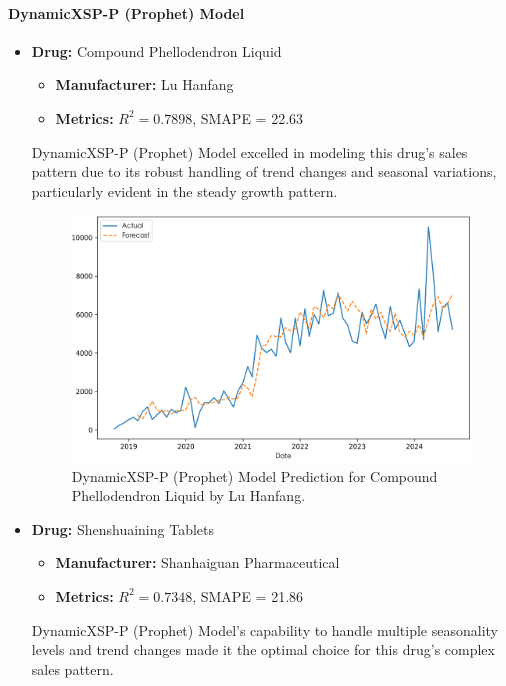 \documentclass[journal]{IEEEtran}
\begin{document}
\paragraph{DynamicXSP-P (Prophet) Model}
\begin{itemize}
\item \textbf{Drug:} Compound Phellodendron Liquid
\begin{itemize}
\item \textbf{Manufacturer:} Lu Hanfang
\item \textbf{Metrics:} $R^2 = 0.7898$, SMAPE = 22.63
\end{itemize}
DynamicXSP-P (Prophet) Model excelled in modeling this drug's sales pattern due to its robust handling of trend changes and seasonal variations, particularly evident in the steady growth pattern.
\begin{figure}[H]
\centering
\includegraphics[width=\linewidth]{../Result_Paper/Prophet_Prediction_复方黄柏液涂剂_鲁汉方.png}
\caption{DynamicXSP-P (Prophet) Model Prediction for Compound Phellodendron Liquid by Lu Hanfang.}
\label{fig:phellodendron}
\end{figure}
\item \textbf{Drug:} Shenshuaining Tablets
\begin{itemize}
\item \textbf{Manufacturer:} Shanhaiguan Pharmaceutical
\item \textbf{Metrics:} $R^2 = 0.7348$, SMAPE = 21.86
\end{itemize}
DynamicXSP-P (Prophet) Model's capability to handle multiple seasonality levels and trend changes made it the optimal choice for this drug's complex sales pattern.
\begin{figure}[H]
\centering

\end{figure}
\end{itemize}
\end{document}
